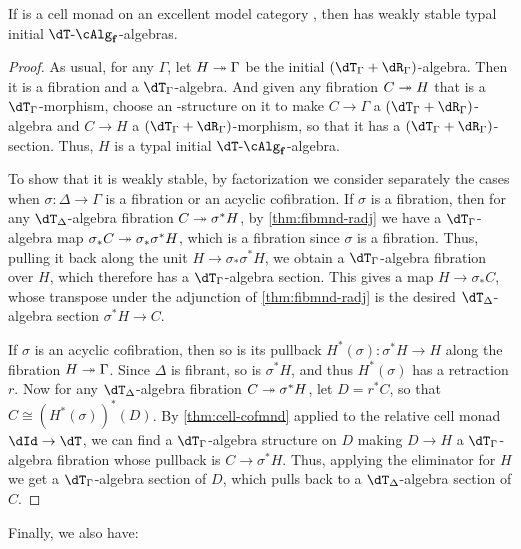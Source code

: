 \documentclass{amsart}
\def\alg{\text{-}\cAlg}
\def\algf{\alg_{\mathbf{f}}}
\begin{document}
\begin{thm}\label{thm:cell-wkstab}
  If \dT is a cell monad on an excellent model category \sM, then \fibmf has weakly stable typal initial $\dT\algf$-algebras.
\end{thm}
\begin{proof}
  As usual, for any $\Gamma$, let $H\twoheadrightarrow\Gamma$ be the initial $(\dT_\Gamma+\dR_\Gamma)$-algebra.
  Then it is a fibration and a $\dT_\Gamma$-algebra.
  And given any fibration $C\twoheadrightarrow H$ that is a $\dT_\Gamma$-morphism, choose an \dR-structure on it to make $C\to\Gamma$ a $(\dT_\Gamma+\dR_\Gamma)$-algebra and $C\to H$ a $(\dT_\Gamma+\dR_\Gamma)$-morphism, so that it has a $(\dT_\Gamma+\dR_\Gamma)$-section.
  Thus, $H$ is a typal initial $\dT\algf$-algebra.

  To show that it is weakly stable, by factorization we consider separately the cases when $\sigma:\Delta\to\Gamma$ is a fibration or an acyclic cofibration.
  If $\sigma$ is a fibration, then for any $\dT_\Delta$-algebra fibration $C\twoheadrightarrow \sigma^*H$, by \cref{thm:fibmnd-radj} we have a $\dT_\Gamma$-algebra map $\sigma_*C\twoheadrightarrow \sigma_*\sigma^*H$, which is a fibration since $\sigma$ is a fibration.
  Thus, pulling it back along the unit $H\to \sigma_*\sigma^* H$, we obtain a $\dT_\Gamma$-algebra fibration over $H$, which therefore has a $\dT_\Gamma$-algebra section.
  This gives a map $H\to \sigma_* C$, whose transpose under the adjunction of \cref{thm:fibmnd-radj} is the desired $\dT_\Delta$-algebra section $\sigma^*H \to C$.

  If $\sigma$ is an acyclic cofibration, then so is its pullback $H^*(\sigma) : \sigma^*H \to H$ along the fibration $H\twoheadrightarrow \Gamma$.
  Since $\Delta$ is fibrant, so is $\sigma^*H$, and thus $H^*(\sigma)$ has a retraction $r$.
  Now for any $\dT_\Delta$-algebra fibration $C\twoheadrightarrow \sigma^*H$, let $D = r^*C$, so that $C \cong (H^*(\sigma))^*(D)$.
  By \cref{thm:cell-cofmnd} applied to the relative cell monad $\dId\to\dT$, we can find a $\dT_\Gamma$-algebra structure on $D$ making $D\to H$ a $\dT_\Gamma$-algebra fibration whose pullback is $C\to\sigma^* H$.
  Thus, applying the eliminator for $H$ we get a $\dT_\Gamma$-algebra section of $D$, which pulls back to a $\dT_\Delta$-algebra section of $C$.
\end{proof}

Finally, we also have:
\end{document}
